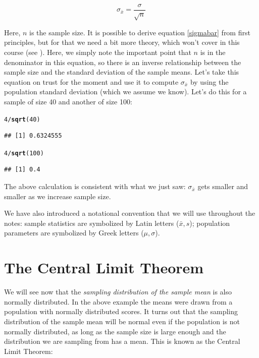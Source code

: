 \documentclass[12pt]{book}\usepackage[]{graphicx}\usepackage[]{color}
\makeatletter
\newcommand{\hlnum}[1]{\textcolor[rgb]{0.686,0.059,0.569}{#1}}%
\newcommand{\hlopt}[1]{\textcolor[rgb]{0,0,0}{#1}}%
\newcommand{\hlstd}[1]{\textcolor[rgb]{0.345,0.345,0.345}{#1}}%
\newcommand{\hlkwd}[1]{\textcolor[rgb]{0.737,0.353,0.396}{\textbf{#1}}}%
\newenvironment{kframe}{%
 \def\at@end@of@kframe{}%
 \ifinner\ifhmode%
  \def\at@end@of@kframe{\end{minipage}}%
  \begin{minipage}{\columnwidth}%
 \fi\fi%
 \def\FrameCommand##1{\hskip\@totalleftmargin \hskip-\fboxsep
 \colorbox{shadecolor}{##1}\hskip-\fboxsep
     \hskip-\linewidth \hskip-\@totalleftmargin \hskip\columnwidth}%
 \MakeFramed {\advance\hsize-\width
   \@totalleftmargin\z@ \linewidth\hsize
   \@setminipage}}%
 {\par\unskip\endMakeFramed%
 \at@end@of@kframe}
\newenvironment{knitrout}{}{} %
\makeatother
\begin{document}
\begin{equation} \label{sigmabar}
\sigma_{\bar{x}} = \frac{\sigma}{\sqrt{n}}
\end{equation}

\noindent
Here, $n$ is the sample size.  It is possible to derive equation
\ref{sigmabar} from first principles, but for that we need a bit more theory, which won't cover in this course (see \cite{kerns}).
Here, we simply note the important point that $n$ is in the denominator in this equation, so there is an inverse relationship between the sample size and the standard deviation of the sample means.
Let's take this equation on trust for the moment and use it to compute
$\sigma_{\bar{x}}$ by using the population standard deviation (which
we assume we know). Let's do this for a sample of size 40 and another of size
100:

\begin{knitrout}
\color{fgcolor}\begin{kframe}
\begin{alltt}
\hlnum{4}\hlopt{/}\hlkwd{sqrt}\hlstd{(}\hlnum{40}\hlstd{)}
\end{alltt}
\begin{verbatim}
## [1] 0.6324555
\end{verbatim}
\begin{alltt}
\hlnum{4}\hlopt{/}\hlkwd{sqrt}\hlstd{(}\hlnum{100}\hlstd{)}
\end{alltt}
\begin{verbatim}
## [1] 0.4
\end{verbatim}
\end{kframe}
\end{knitrout}

\noindent
The above calculation is consistent with what we just saw: $\sigma_{\bar{x}}$ gets smaller and
smaller as we increase sample size.

We have also introduced a notational convention that we will use
throughout the notes: sample statistics are symbolized by Latin letters
($\bar{x}, s$); population parameters are symbolized by Greek letters
($\mu, \sigma$).

\section{The Central Limit Theorem}

We will see now that the \textit{sampling
distribution of the sample mean} is also normally distributed. In the above example the means were
drawn from a population with normally distributed scores.  It
turns out that the sampling distribution of the sample mean will be
normal even if the population is not normally distributed, as long as
the sample size is large enough and the distribution we are sampling from has a mean. This is known as the Central Limit
Theorem:
\end{document}
